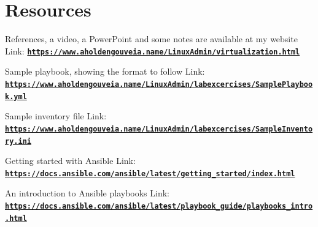 \documentclass[12pt]{article}
\begin{document}
\section*{Resources}
References, a video, a PowerPoint and some notes are available at my website
Link: \href{https://www.aholdengouveia.name/LinuxAdmin/virtualization.html}{\textbf{\nolinkurl{https://www.aholdengouveia.name/LinuxAdmin/virtualization.html}}}

Sample playbook, showing the format to follow
Link: \href{https://www.aholdengouveia.name/LinuxAdmin/labexcercises/SamplePlaybook.yml}{\textbf{\nolinkurl{https://www.aholdengouveia.name/LinuxAdmin/labexcercises/SamplePlaybook.yml}}}

Sample inventory file
Link: \href{https://www.aholdengouveia.name/LinuxAdmin/labexcercises/SampleInventory.ini}{\textbf{\nolinkurl{https://www.aholdengouveia.name/LinuxAdmin/labexcercises/SampleInventory.ini}}}

Getting started with Ansible
Link: \href{https://docs.ansible.com/ansible/latest/getting_started/index.html}{\textbf{\nolinkurl{https://docs.ansible.com/ansible/latest/getting_started/index.html}}}

An introduction to Ansible playbooks
Link: \href{https://docs.ansible.com/ansible/latest/playbook_guide/playbooks_intro.html}{\textbf{\nolinkurl{https://docs.ansible.com/ansible/latest/playbook_guide/playbooks_intro.html}}}

\end{document}
